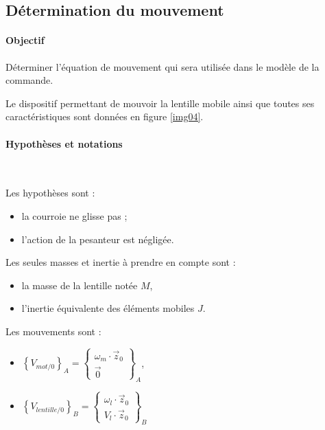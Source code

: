 \subsection{Détermination du mouvement}

\paragraph{Objectif}

Déterminer l'équation de mouvement qui sera utilisée dans le modèle de la commande.

Le dispositif permettant de mouvoir la lentille mobile ainsi que toutes ses caractéristiques sont données en figure \ref{img04}.

\paragraph{Hypothèses et notations} ~\

Les hypothèses sont :
\begin{itemize}
 \item la courroie ne glisse pas ;
 \item l'action de la pesanteur est négligée.
\end{itemize}

Les seules masses et inertie à prendre en compte sont :
\begin{itemize}
 \item la masse de la lentille notée $M$,
 \item l'inertie équivalente des éléments mobiles $J$.
\end{itemize}

Les mouvements sont :
\begin{itemize}
 \item $\left\{V_{mot/0}\right\}_A=\left\{\begin{array}{c}
 \omega_m\cdot\vec{z}_0 \\
 \vec{0} 
 \end{array}\right\}_A$,
 \item $\left\{V_{lentille/0}\right\}_B=\left\{\begin{array}{c}
 \omega_l\cdot\vec{z}_0 \\
 V_l\cdot\vec{z}_0
 \end{array}\right\}_B$
\end{itemize}


